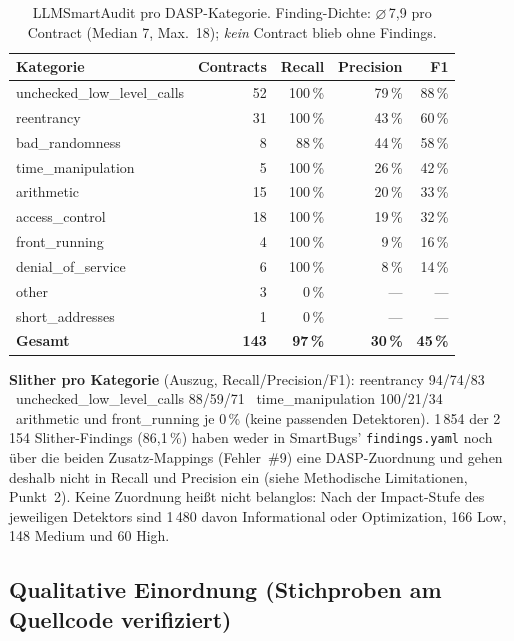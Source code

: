 \documentclass[11pt,a4paper]{scrartcl}
\newcommand{\code}[1]{\texttt{#1}}
\begin{document}
\begin{table}[h!]
\centering
\small
\begin{tabular}{@{}lrrrr@{}}
\toprule
Kategorie & Contracts & Recall & Precision & F1 \\
\midrule
unchecked\_low\_level\_calls & 52 & 100\,\% & 79\,\% & 88\,\% \\
reentrancy & 31 & 100\,\% & 43\,\% & 60\,\% \\
bad\_randomness & 8 & 88\,\% & 44\,\% & 58\,\% \\
time\_manipulation & 5 & 100\,\% & 26\,\% & 42\,\% \\
arithmetic & 15 & 100\,\% & 20\,\% & 33\,\% \\
access\_control & 18 & 100\,\% & 19\,\% & 32\,\% \\
front\_running & 4 & 100\,\% & 9\,\% & 16\,\% \\
denial\_of\_service & 6 & 100\,\% & 8\,\% & 14\,\% \\
other & 3 & 0\,\% & --- & --- \\
short\_addresses & 1 & 0\,\% & --- & --- \\
\midrule
\textbf{Gesamt} & \textbf{143} & \textbf{97\,\%} & \textbf{30\,\%} & \textbf{45\,\%} \\
\bottomrule
\end{tabular}
\caption{LLMSmartAudit pro DASP-Kategorie. Finding-Dichte: $\varnothing$\,7{,}9 pro Contract (Median 7, Max.\ 18); \emph{kein} Contract blieb ohne Findings.}
\end{table}

\textbf{Slither pro Kategorie} (Auszug, Recall/Precision/F1): reentrancy 94/74/83 \textbullet\ unchecked\_low\_level\_calls 88/59/71 \textbullet\ time\_manipulation 100/21/34 \textbullet\ arithmetic und front\_running je 0\,\% (keine passenden Detektoren). 1\,854 der 2\,154 Slither-Findings (86{,}1\,\%) haben weder in SmartBugs' \code{findings.yaml} noch über die beiden Zusatz-Mappings (Fehler~\#9) eine DASP-Zuordnung und gehen deshalb nicht in Recall und Precision ein (siehe Methodische Limitationen, Punkt~2). Keine Zuordnung heißt nicht belanglos: Nach der Impact-Stufe des jeweiligen Detektors sind 1\,480 davon Informational oder Optimization, 166 Low, 148 Medium und 60 High.

\subsection{Qualitative Einordnung (Stichproben am Quellcode verifiziert)}
\end{document}
